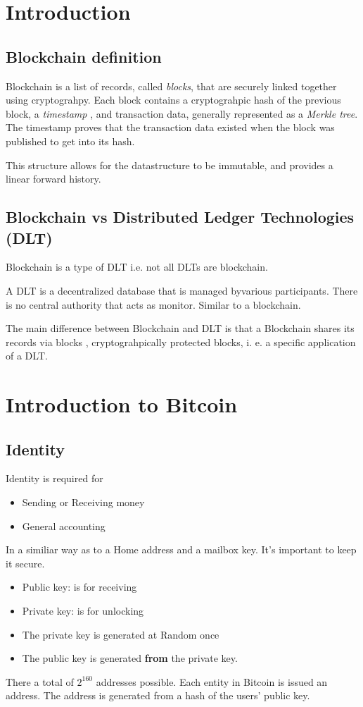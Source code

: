 \documentclass[a4paper, 12pt]{report}
\begin{document}
\chapter{Introduction}
\section{Blockchain definition}
Blockchain is a list of records, called \textit{blocks}, that are securely linked together
using cryptograhpy. Each block contains a cryptograhpic hash of the previous block, a \textit{timestamp}
, and transaction data, generally represented as a \textit{Merkle tree}. The timestamp proves
that the transaction data existed when the block was published to get into its hash.

This structure allows for the datastructure to be immutable, and provides a linear forward history.
\section{Blockchain vs Distributed Ledger Technologies (DLT)}
Blockchain is a type of DLT i.e. not all DLTs are blockchain.

A DLT is a decentralized database that is managed byvarious participants. There is no central
authority that acts as monitor. Similar to a blockchain.

The main difference between Blockchain and DLT is that a Blockchain shares its records via blocks
, cryptograhpically protected blocks, i. e. a specific application of a DLT.

\chapter{Introduction to Bitcoin}
\section{Identity}
Identity is required for
\begin{itemize}
    \item Sending or Receiving money
    \item General accounting
\end{itemize}
In a similiar way as to a Home address and a mailbox key.
It's important to keep it secure.
\begin{itemize}
    \item Public key: is for receiving
    \item Private key: is for unlocking
    \item The private key is generated at Random once
    \item The public key is generated \textbf{from} the private key.
\end{itemize}
There a total of $2^{160}$ addresses possible. Each entity 
in Bitcoin is issued an address. The address is generated
from a hash of the users' public key. 
\end{document}
